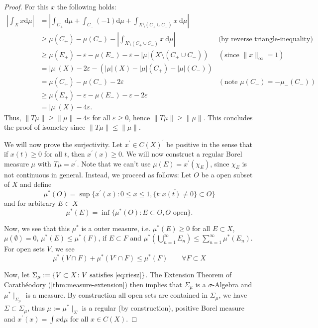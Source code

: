 \begin{proof}
	For this $x$ the following holds:
	\begin{align*}
		\left|\int_X x\mathrm{d}\mu\right|&=\left|\int_{C_+}\mathrm{d}\mu+\int_{C_-}(-1)\mathrm{d}\mu+\int_{X\setminus(C_+\cup C_-)}x~\mathrm{d}\mu\right|&\\
		&\geq \mu(C_+)-\mu(C_-)-\left|\int_{X\setminus(C_+\cup C_-)}x~\mathrm{d}\mu\right|&\text{(by reverse triangle-inequality)}\\
		&\geq \mu(E_+)-\varepsilon-\mu(E_-)-\varepsilon-|\mu|(X\setminus(C_+\cup C_-))&(\text{since } \|x\|_\infty=1)\\
		&=|\mu|(X)-2\varepsilon-(|\mu|(X)-|\mu|(C_+)-|\mu|(C_-))\\
		&=\mu(C_+)-\mu(C_-)-2\varepsilon&(\text{note } \mu(C_-)=-\mu_-(C_-))\\
		&\geq \mu(E_+)-\varepsilon-\mu(E_-)-\varepsilon-2\varepsilon\\
		&=|\mu|(X)-4\varepsilon.
	\end{align*}
	Thus, $\|T\mu\|\geq \|\mu\|-4\varepsilon$ for all $\varepsilon\geq 0$, hence $\|T\mu\|\geq\|\mu\|$. This concludes the proof of isometry since $\|T\mu\|\leq\|\mu\|$.
	
	We will now prove the surjectivity. Let $x^\prime\in C(X)^\prime$ be positive in the sense that if $x(t)\geq 0$ for all $t$, then $x^\prime(x)\geq 0$. We will now construct a regular Borel measure $\mu$ with $T\mu=x^\prime$. Note that we can't use $\mu(E)=x^\prime(\chi_E)$, since $\chi_E$ is not continuous in general. Instead, we proceed as follows: Let $O$ be a open subset of $X$ and define
	\[
	\mu^\ast(O)=\sup\{x^\prime(x)\colon 0\leq x\leq 1, \overline{\{t\colon x(t)\neq 0\}}\subset O \}
	\]
	and for arbitrary $E\subset X$
	\[
	\mu^\ast(E)=\inf\{\mu^\ast(O)\colon E\subset O, O \text{ open}\}.
	\]
	
	Now, we see that this $\mu^\ast$ is a outer measure, i.e. $\mu^\ast(E)\geq 0$ for all $E\subset X$, $\mu(\emptyset)=0$, $\mu^\ast(E)\leq \mu^\ast(F)$, if $E\subset F$ and $\mu^\ast\left(\bigcup_{n=1}^\infty E_n\right)\leq\sum_{n=1}^{\infty}\mu^\ast(E_n)$. For open sets $V$, we see 
	\begin{equation}\label{eq:riesz}
	\mu^\ast(V\cap F)+\mu^\ast(V^c\cap F)\leq \mu^\ast(F)\qquad \forall F\subset X
	\end{equation}
	
	Now, let $\Sigma_\mu:=\{V\subset X\colon V \text{ satisfies }\eqref{eq:riesz}\}$. The Extension Theorem of Carathéodory (\autoref{thm:measure-extension}) 
	then implies that $\Sigma_\mu$ is a $\sigma$-Algebra and $\mu^\ast\mid_{\Sigma_\mu}$ is a measure. By %
	construction all open sets are contained in $\Sigma_\mu$, we have $\Sigma\subset \Sigma_\mu$, thus $\mu:=\mu^\ast\mid_\Sigma$ is a regular (by construction), positive Borel measure and $x^\prime(x)=\int x\mathrm{d}\mu$ for all $x\in C(X)$.
	

\end{proof}
